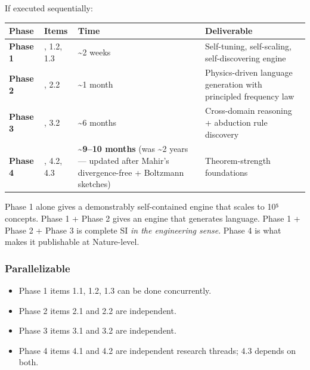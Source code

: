 \documentclass[
  11pt,
  a4paper,
]{article}
\providecommand{\tightlist}{%
  \setlength{\itemsep}{0pt}\setlength{\parskip}{0pt}}
\begin{document}
If executed sequentially:

\begin{longtable}[]{@{}
  >{\raggedright\arraybackslash}p{}
  >{\raggedright\arraybackslash}p{}
  >{\raggedright\arraybackslash}p{}
  >{\raggedright\arraybackslash}p{}@{}}
\toprule\noalign{}
\begin{minipage}[b]{\linewidth}\raggedright
Phase
\end{minipage} & \begin{minipage}[b]{\linewidth}\raggedright
Items
\end{minipage} & \begin{minipage}[b]{\linewidth}\raggedright
Time
\end{minipage} & \begin{minipage}[b]{\linewidth}\raggedright
Deliverable
\end{minipage} \\
\midrule\noalign{}
\endhead
\bottomrule\noalign{}
\endlastfoot
\textbf{Phase 1} & 1.1, 1.2, 1.3 & \textasciitilde2 weeks & Self-tuning,
self-scaling, self-discovering engine \\
\textbf{Phase 2} & 2.1, 2.2 & \textasciitilde1 month & Physics-driven
language generation with principled frequency law \\
\textbf{Phase 3} & 3.1, 3.2 & \textasciitilde6 months & Cross-domain
reasoning + abduction rule discovery \\
\textbf{Phase 4} & 4.1, 4.2, 4.3 & \textbf{\textasciitilde9--10 months}
(was \textasciitilde2 years --- updated after Mahir's divergence-free +
Boltzmann sketches) & Theorem-strength foundations \\
\end{longtable}

Phase 1 alone gives a demonstrably self-contained engine that scales to
10⁵ concepts. Phase 1 + Phase 2 gives an engine that generates language.
Phase 1 + Phase 2 + Phase 3 is complete SI \emph{in the engineering
sense}. Phase 4 is what makes it publishable at Nature-level.

\subsubsection{Parallelizable}\label{parallelizable}

\begin{itemize}
\tightlist
\item
  Phase 1 items 1.1, 1.2, 1.3 can be done concurrently.
\item
  Phase 2 items 2.1 and 2.2 are independent.
\item
  Phase 3 items 3.1 and 3.2 are independent.
\item
  Phase 4 items 4.1 and 4.2 are independent research threads; 4.3
  depends on both.
\end{itemize}
\end{document}
